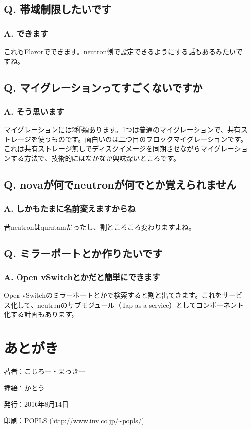 \documentclass[9pt,b5paper,tombo,openany]{jsbook}
\begin{document}
\section*{Q. 帯域制限したいです}
\subsection*{A. できます}
これもFlavorでできます。neutron側で設定できるようにする話もあるみたいですね。

\section*{Q. マイグレーションってすごくないですか}
\subsection*{A. そう思います}
マイグレーションには2種類あります。1つは普通のマイグレーションで、共有ストレージを使うものです。面白いのは二つ目のブロックマイグレーションです。これは共有ストレージ無しでディスクイメージを同期させながらマイグレーションする方法で、技術的にはなかなか興味深いところです。

\section*{Q. novaが何でneutronが何でとか覚えられません}
\subsection*{A. しかもたまに名前変えますからね}
昔neutronはqurntamだったし、割ところころ変わりますよね。

\section*{Q. ミラーポートとか作りたいです}
\subsection*{A. Open vSwitchとかだと簡単にできます}
Open vSwitchのミラーポートとかで検索すると割と出てきます。これをサービス化して、neutronのサブモジュール（Tap as a service）としてコンポーネント化する計画もあります。

\chapter{あとがき}

\thispagestyle{empty}
\begin{flushright}
	\begin{minipage}{0.5\hsize}
		\begin{description}
			\item{著者：}こじろー・まっきー
			\item{挿絵：}かとう
			\item{発行：}2016年8月14日
			\item{印刷：}POPLS (\url{http://www.inv.co.jp/~popls/})
		\end{description}
	\end{minipage}
\end{flushright}
\end{document}
